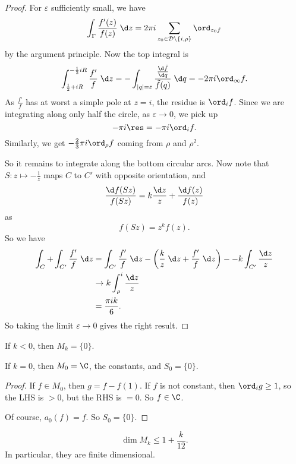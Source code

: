 \documentclass[a4paper]{article}
\begin{document}
\begin{proof}
  For $\varepsilon$ sufficiently small, we have
  \[
    \int_\Gamma \frac{f'(z)}{f(z)}\;\d z = 2\pi i \sum_{z_0 \in \mathcal{D} \setminus \{i, \rho\}} \ord_{z_0 f}
  \]
  by the argument principle. Now the top integral is
  \[
    \int_{\frac{1}{2} + iR}^{-\frac{1}{2} iR} \frac{f'}{f}\;\d z = -\int_{|q| = \varepsilon} \frac{\frac{\d \tilde{f}}{\d q}}{\tilde{f}(q)} \;\d q = -2\pi i \ord_{\infty} f.
  \]
  As $\frac{f'}{f}$ has at worst a simple pole at $z = i$, the residue is $\ord_i f$. Since we are integrating along only half the circle, as $\varepsilon \to 0$, we pick up
  \[
    - \pi i \res = - \pi i \ord_i f.
  \]
  Similarly, we get $-\frac{2}{3} \pi i \ord_\rho f$ coming from $\rho$ and $\rho^2$.

  So it remains to integrate along the bottom circular arcs. Now note that $S: z \mapsto -\frac{1}{z}$ maps $C$ to $C'$ with opposite orientation, and
  \[
    \frac{\d f(Sz)}{f(Sz)} = k \frac{\d z}{z} + \frac{\d f(z)}{f(z)}
  \]
  as
  \[
    f(Sz) = z^k f(z).
  \]
  So we have
  \begin{align*}
    \int_C + \int_{C'} \frac{f'}{f}\;\d z &= \int_{C'} \frac{f'}{f}\;\d z - \left(\frac{k}{z} \;\d z + \frac{f'}{f}\;\d z\right) - -k \int_{C'} \frac{\d z}{z}\\
    &\to k \int_\rho^i \frac{\d z}{z} \\
    &= \frac{\pi i k}{6}.
  \end{align*}
  So taking the limit $\varepsilon \to 0$ gives the right result.
\end{proof}

\begin{cor}
  If $k < 0$, then $M_k = \{0\}$.
\end{cor}

\begin{cor}
  If $k = 0$, then $M_0 = \C$, the constants, and $S_0 = \{0\}$.
\end{cor}

\begin{proof}
  If $f \in M_0$, then $g = f - f(1)$. If $f$ is not constant, then $\ord_i g \geq 1$, so the LHS is $>0$, but the RHS is $=0$. So $f \in \C$.

  Of course, $a_0(f) = f$. So $S_0 = \{0\}$.
\end{proof}

\begin{cor}
  \[
    \dim M_k \leq 1 + \frac{k}{12}.
  \]
  In particular, they are finite dimensional.
\end{cor}
\end{document}

